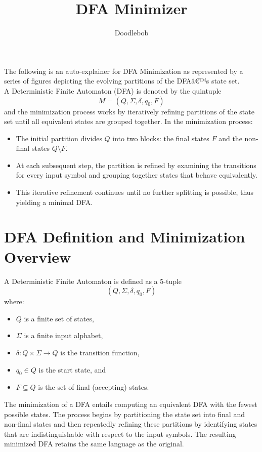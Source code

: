 \documentclass{article}
\begin{document}
\title{\textbf{DFA Minimizer}}
\author{Doodlebob}
\date{}
\maketitle
\thispagestyle{fancy}

The following is an auto-explainer for DFA Minimization as represented by a series of figures depicting the evolving partitions of the DFAâ€™s state set. \\

A Deterministic Finite Automaton (DFA) is denoted by the quintuple
\[
M = (Q, \Sigma, \delta, q_0, F)
\]
and the minimization process works by iteratively refining partitions of the state set until all equivalent states are grouped together. In the minimization process:
\begin{itemize}
    \item The initial partition divides $Q$ into two blocks: the final states $F$ and the non-final states $Q \setminus F$.
    \item At each subsequent step, the partition is refined by examining the transitions for every input symbol and grouping together states that behave equivalently.
    \item This iterative refinement continues until no further splitting is possible, thus yielding a minimal DFA.
\end{itemize}

\section{DFA Definition and Minimization Overview}

A Deterministic Finite Automaton is defined as a 5-tuple 
\[
(Q, \Sigma, \delta, q_0, F)
\]
where:
\begin{itemize}
    \item $Q$ is a finite set of states,
    \item $\Sigma$ is a finite input alphabet,
    \item $\delta : Q \times \Sigma \rightarrow Q$ is the transition function,
    \item $q_0 \in Q$ is the start state, and
    \item $F \subseteq Q$ is the set of final (accepting) states.
\end{itemize}

The minimization of a DFA entails computing an equivalent DFA with the fewest possible states. The process begins by partitioning the state set into final and non-final states and then repeatedly refining these partitions by identifying states that are indistinguishable with respect to the input symbols. The resulting minimized DFA retains the same language as the original.
\end{document}
